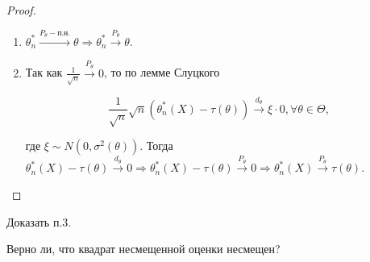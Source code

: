 \begin{proof} \
\begin{enumerate}
    \item $\displaystyle \theta _{n}^{*}\xrightarrow{P_{\theta } -п.н.} \theta \Rightarrow \theta _{n}^{*}\xrightarrow{P_{\theta }} \theta $.
    
    \item Так как $\displaystyle \frac{1}{\sqrt{n}}\xrightarrow{P_{\theta }} 0$, то по лемме Слуцкого


\begin{equation*}
\frac{1}{\sqrt{n}}\sqrt{n}\left( \theta _{n}^{*}( X) -\tau ( \theta )\right)\xrightarrow{d_{\theta }} \xi \cdotp 0,\forall \theta \in \Theta ,
\end{equation*}


где $\displaystyle \xi \sim N\left( 0,\sigma ^{2}( \theta )\right)$. Тогда $\displaystyle \theta _{n}^{*}( X) -\tau ( \theta )\xrightarrow{d_{\theta }} 0\Rightarrow \theta _{n}^{*}( X) -\tau ( \theta )\xrightarrow{P_{\theta }} 0\Rightarrow \theta _{n}^{*}( X)\xrightarrow{P_{\theta }} \tau ( \theta )$.
\end{enumerate}
\end{proof}
 
\begin{exercise}
Доказать п.3.
\end{exercise}
\begin{exercise}
Верно ли, что квадрат несмещенной оценки несмещен?
\end{exercise}
